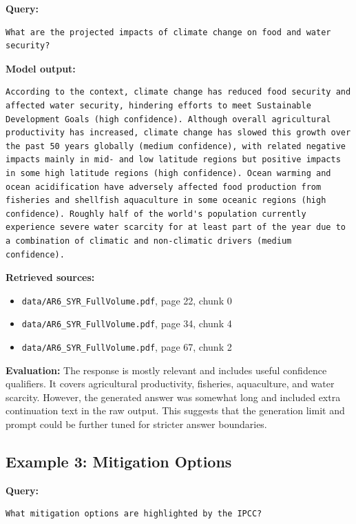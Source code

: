 \documentclass[11pt,a4paper]{article}
\begin{document}
\textbf{Query:}
\begin{lstlisting}
What are the projected impacts of climate change on food and water security?
\end{lstlisting}

\textbf{Model output:}
\begin{lstlisting}
According to the context, climate change has reduced food security and affected water security, hindering efforts to meet Sustainable Development Goals (high confidence). Although overall agricultural productivity has increased, climate change has slowed this growth over the past 50 years globally (medium confidence), with related negative impacts mainly in mid- and low latitude regions but positive impacts in some high latitude regions (high confidence). Ocean warming and ocean acidification have adversely affected food production from fisheries and shellfish aquaculture in some oceanic regions (high confidence). Roughly half of the world's population currently experience severe water scarcity for at least part of the year due to a combination of climatic and non-climatic drivers (medium confidence).
\end{lstlisting}

\textbf{Retrieved sources:}
\begin{itemize}
    \item \texttt{data/AR6\_SYR\_FullVolume.pdf}, page 22, chunk 0
    \item \texttt{data/AR6\_SYR\_FullVolume.pdf}, page 34, chunk 4
    \item \texttt{data/AR6\_SYR\_FullVolume.pdf}, page 67, chunk 2
\end{itemize}

\textbf{Evaluation:} The response is mostly relevant and includes useful confidence qualifiers. It covers agricultural productivity, fisheries, aquaculture, and water scarcity. However, the generated answer was somewhat long and included extra continuation text in the raw output. This suggests that the generation limit and prompt could be further tuned for stricter answer boundaries.

\subsection{Example 3: Mitigation Options}

\textbf{Query:}
\begin{lstlisting}
What mitigation options are highlighted by the IPCC?
\end{lstlisting}
\end{document}
